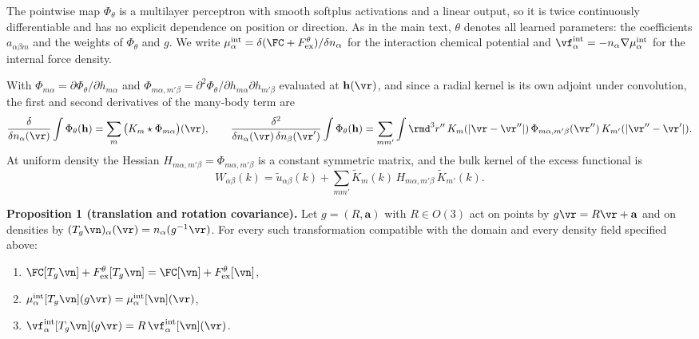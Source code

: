 The pointwise map $\Phi_\theta$ is a multilayer perceptron with smooth softplus activations and a linear output, so it is twice continuously differentiable and has no explicit dependence on position or direction. As in the main text, $\theta$ denotes all learned parameters: the coefficients $a_{\alpha\beta m}$ and the weights of $\Phi_\theta$ and $g$. We write $\mu^{\rm int}_\alpha=\delta(\FC+F^\theta_{\rm ex})/\delta n_\alpha$ for the interaction chemical potential and $\vf^{\rm int}_\alpha=-n_\alpha\nabla\mu^{\rm int}_\alpha$ for the internal force density. 

With $\Phi_{m\alpha}=\partial\Phi_\theta/\partial h_{m\alpha}$ and $\Phi_{m\alpha,m'\beta}=\partial^2\Phi_\theta/\partial h_{m\alpha}\partial h_{m'\beta}$ evaluated at $\mathbf h(\vr)$, and since a radial kernel is its own adjoint under convolution, the first and second derivatives of the many-body term are
\begin{equation}
\frac{\delta}{\delta n_\alpha(\vr)}\int\Phi_\theta(\mathbf h)=\sum_m\big(K_m\star\Phi_{m\alpha}\big)(\vr),\qquad \frac{\delta^2}{\delta n_\alpha(\vr)\,\delta n_\beta(\vr')}\int\Phi_\theta(\mathbf h)=\sum_{mm'}\int \rmd^3r''\,K_m(|\vr-\vr''|)\,\Phi_{m\alpha,m'\beta}(\vr'')\,K_{m'}(|\vr''-\vr'|).
\label{eq:S:derivs}
\end{equation}
At uniform density the Hessian $H_{m\alpha,m'\beta}=\Phi_{m\alpha,m'\beta}$ is a constant symmetric matrix, and the bulk kernel of the excess functional is
\begin{equation}
W_{\alpha\beta}(k)=\tilde u_{\alpha\beta}(k)+\sum_{mm'}\tilde K_m(k)\,H_{m\alpha,m'\beta}\,\tilde K_{m'}(k).
\label{eq:S:W}
\end{equation}

\textbf{Proposition 1 (translation and rotation covariance).} Let $g=(R,\mathbf a)$ with $R\in O(3)$ act on points by $g\vr=R\vr+\mathbf a$ and on densities by $(T_g\vn)_\alpha(\vr)=n_\alpha(g^{-1}\vr)$. For every such transformation compatible with the domain and every density field specified above:
\begin{enumerate}
    \item[i] $\FC[T_g\vn]+F^\theta_{\rm ex}[T_g\vn]=\FC[\vn]+F^\theta_{\rm ex}[\vn]$,
    \item[ii] $\mu^{\rm int}_\alpha[T_g\vn](g\vr)=\mu^{\rm int}_\alpha[\vn](\vr)$,
    \item[iii]  $\vf^{\rm int}_\alpha[T_g\vn](g\vr)=R\,\vf^{\rm int}_\alpha[\vn](\vr)$.
\end{enumerate}


